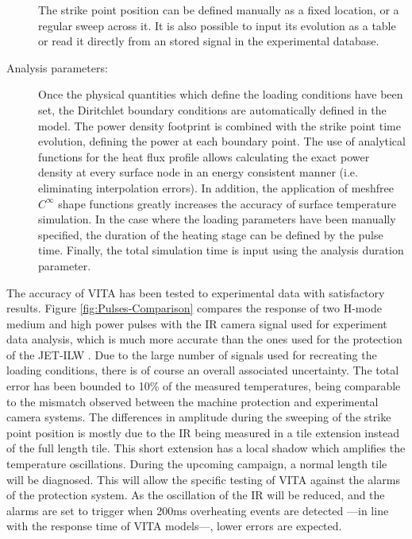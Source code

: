 \begin{description}
	The strike point position can be defined manually as a fixed location, or a regular sweep across it. It is also possible to input its evolution as a table or read it directly from an stored signal in the experimental database.
	
	\item[Analysis parameters:] Once the physical quantities which define the loading conditions have been set, the Diritchlet boundary conditions are automatically defined in the model. The power density footprint is combined with the strike point time evolution, defining the power at each boundary point. The use of analytical functions for the heat flux profile allows calculating the exact power density at every surface node in an energy consistent manner (i.e. eliminating interpolation errors). In addition, the application of meshfree $C^{\infty}$ shape functions greatly increases the accuracy of surface temperature simulation. In the case where the loading parameters have been manually specified, the duration of the heating stage can be defined by the pulse time. Finally, the total simulation time is input using the analysis duration parameter.
	
\end{description}

The accuracy of VITA has been tested to experimental data with satisfactory results. Figure \ref{fig:Pulses-Comparison} compares the response of two H-mode medium and high power pulses with the IR camera signal used for experiment data analysis, which is much more accurate than the ones used for the protection of the JET-ILW \cite{Jouve2011}. Due to the large number of signals used for recreating the loading conditions, there is of course an overall associated uncertainty. The total error has been bounded to 10\% of the measured temperatures, being comparable to the mismatch observed between the machine protection and experimental camera systems. The differences in amplitude during the sweeping of the strike point position is mostly due to the IR being measured in a tile extension instead of the full length tile. This short extension has a local shadow which amplifies the temperature oscillations. During the upcoming campaign, a normal length tile will be diagnosed. This will allow the specific testing of VITA against the alarms of the protection system. As the oscillation of the IR will be reduced, and the alarms are set to trigger when 200ms overheating events are detected \cite{Arnoux2012}---in line with the response time of VITA models---, lower errors are expected.

